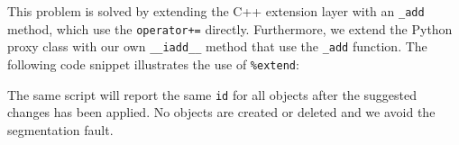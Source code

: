 This problem is solved by extending the C++ extension layer with an \texttt{\_add} method, which use the \texttt{operator+=} directly. Furthermore, we extend the Python proxy class with our own \texttt{\_\_iadd\_\_} method that use the \texttt{\_add} function. The following code snippet illustrates the use of \texttt{\%extend}:
The same script will report the same \texttt{id} for all objects after the suggested changes has been applied. No objects are created or deleted and we avoid the segmentation fault.\par

